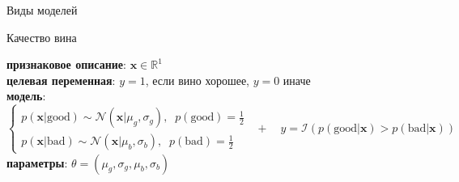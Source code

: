 \documentclass[aspectratio=169]{beamer}
\begin{document}
\begin{frame}{Виды моделей}
    
\end{frame}

\begin{frame}{Качество вина}
    
{\bf признаковое описание}: $\mathbf{x} \in \mathbb{R}^1$ \\
\vspace{1em}
{\bf целевая переменная}: $y = 1$, если вино хорошее, $y = 0$ иначе \\
\vspace{1em}
{\bf модель}:
\[
\begin{cases}
p(\mathbf{x} | \text{good}) \sim \mathcal{N}(\mathbf{x} | \mu_g, \sigma_g), \;\; p(\text{good}) = \frac 1 2 \\
p(\mathbf{x} |  \text{bad}) \sim \mathcal{N}(\mathbf{x} | \mu_b, \sigma_b), \;\; p( \text{bad}) = \frac 1 2
\end{cases} \;\; + \quad y = \mathcal{I}(p(\text{good} | \mathbf{x}) > p(\text{bad} | \mathbf{x}))
\]
\vspace{1em}
{\bf параметры}: $\theta = (\mu_g, \sigma_g, \mu_b, \sigma_b)$

\end{frame}
\end{document}
